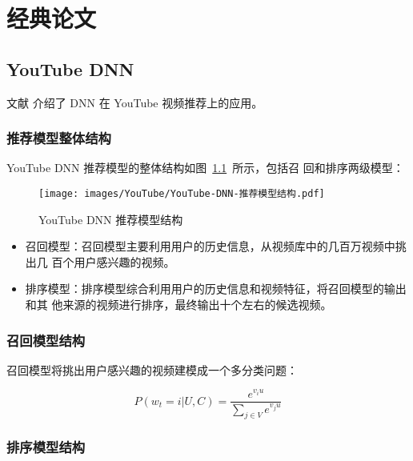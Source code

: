 \chapter{经典论文}
\section{YouTube DNN}

文献  介绍了 DNN 在 YouTube 视频推荐上的应用。

\subsection{推荐模型整体结构}
YouTube DNN 推荐模型的整体结构如图~\ref{fig:youtube-dnn-structure}~所示，包括召
回和排序两级模型：

\begin{figure}[ht]
  \centering
  \texttt{[image: images/YouTube/YouTube-DNN-推荐模型结构.pdf]}
  \caption{YouTube DNN 推荐模型结构}
  \label{fig:youtube-dnn-structure}
\end{figure}

\begin{itemize}
  \item 召回模型：召回模型主要利用用户的历史信息，从视频库中的几百万视频中挑出几
    百个用户感兴趣的视频。
  \item 排序模型：排序模型综合利用用户的历史信息和视频特征，将召回模型的输出和其
    他来源的视频进行排序，最终输出十个左右的候选视频。
\end{itemize}

\subsection{召回模型结构}
召回模型将挑出用户感兴趣的视频建模成一个多分类问题：

\begin{equation}
  P(w_t=i|U, C) = \frac{e^{v_i u}}{\sum_{j \in V} e^{v_j u}}
\end{equation}

\subsection{排序模型结构}


